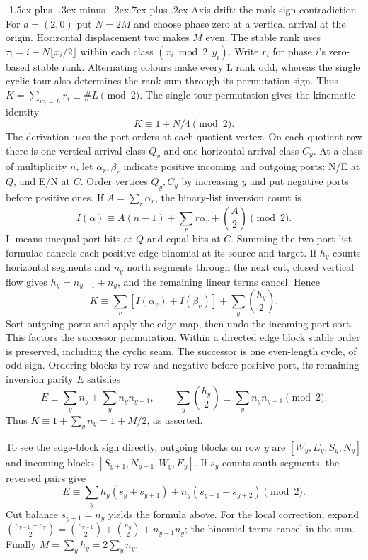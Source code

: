 \documentclass[11pt,letterpaper]{article}
\makeatletter
\renewcommand\subsection{\@startsection{subsection}{2}{\z@}%
  {-1.5ex plus -.3ex minus -.2ex}{.7ex plus .2ex}%
  {\normalfont\large\bfseries}}
\makeatother
\begin{document}
\subsection{Axis drift: the rank-sign contradiction}
For $d=(2,0)$ put $N=2M$ and choose phase zero at a vertical arrival
at the origin. Horizontal displacement two makes $M$ even.
The stable rank uses $\tau_i=i-N\lfloor x_i/2\rfloor$ within
each class $(x_i\bmod2,y_i)$. Write $r_i$ for phase $i$'s zero-based
stable rank. Alternating colours make every L rank odd, whereas the
single cyclic tour also determines the rank sum through its permutation sign. Thus
$K=\sum_{w_i=L}r_i\equiv\#L\pmod2$.
The single-tour permutation gives the kinematic identity
\[
K\equiv1+N/4\pmod2.
\]
The derivation uses the port orders at each quotient vertex. On each quotient row there is one vertical-arrival
class $Q_y$ and one horizontal-arrival class $C_y$. At a class of
multiplicity $n$, let $\alpha_r,\beta_r$ indicate positive incoming and
outgoing ports: N/E at $Q$, and E/N at $C$. Order vertices
$Q_y,C_y$ by increasing $y$ and put negative ports before positive
ones. If $A=\sum_r\alpha_r$, the binary-list inversion count is
\[
I(\alpha)\equiv A(n-1)+\sum_r r\alpha_r+\binom A2\pmod2.
\]
L means unequal port bits at $Q$ and equal bits at $C$.
Summing the two port-list formulae cancels each positive-edge binomial
at its source and target. If $h_y$ counts horizontal segments and
$n_y$ north segments through the next cut, closed vertical flow gives
$h_y=n_{y-1}+n_y$, and the remaining linear terms cancel. Hence
\[
K\equiv\sum_v[I(\alpha_v)+I(\beta_v)]+\sum_y\binom{h_y}{2}.
\]
Sort outgoing ports and apply the edge map, then undo the incoming-port
sort. This factors the successor permutation. Within a directed edge block stable
order is preserved, including the cyclic seam. The successor is one
even-length cycle, of odd sign. Ordering blocks by row and negative
before positive port, its remaining inversion parity $E$ satisfies
\[
E\equiv\sum_y n_y+\sum_y n_yn_{y+1},\qquad
\sum_y\binom{h_y}{2}\equiv\sum_y n_yn_{y+1}\pmod2.
\]
Thus $K\equiv1+\sum_y n_y=1+M/2$, as asserted.

To see the edge-block sign directly, outgoing blocks on row $y$ are
$[W_y,E_y,S_y,N_y]$ and incoming blocks
$[S_{y+1},N_{y-1},W_y,E_y]$. If $s_y$ counts south segments,
the reversed pairs give
\[
E\equiv\sum_y h_y(s_y+s_{y+1})+
n_y(s_{y+1}+s_{y+2})\pmod2.
\]
Cut balance $s_{y+1}=n_y$ yields the formula above. For the local
correction, expand
$\binom{n_{y-1}+n_y}{2}=\binom{n_{y-1}}2+
\binom{n_y}2+n_{y-1}n_y$; the binomial terms cancel in the
sum. Finally $M=\sum_yh_y=2\sum_yn_y$.
\end{document}
